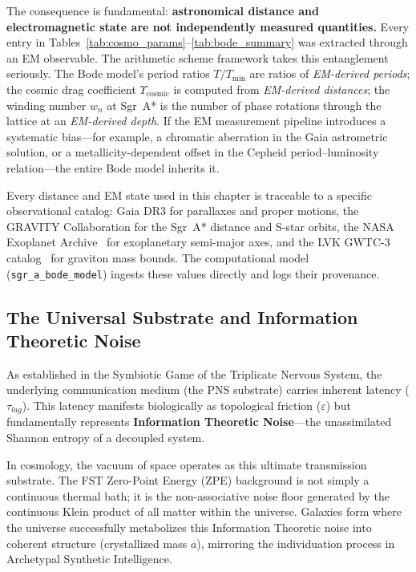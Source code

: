 The consequence is fundamental: \textbf{astronomical distance and electromagnetic state are not independently measured quantities.} Every entry in Tables~\ref{tab:cosmo_params}--\ref{tab:bode_summary} was extracted through an EM observable. The arithmetic scheme framework takes this entanglement seriously. The Bode model's period ratios $T/T_{\min}$ are ratios of \emph{EM-derived periods}; the cosmic drag coefficient $\Upsilon_{\mathrm{cosmic}}$ is computed from \emph{EM-derived distances}; the winding number $w_n$ at Sgr~A* is the number of phase rotations through the lattice at an \emph{EM-derived depth}. If the EM measurement pipeline introduces a systematic bias---for example, a chromatic aberration in the Gaia astrometric solution, or a metallicity-dependent offset in the Cepheid period--luminosity relation---the entire Bode model inherits it.

\begin{remark}[Auditability]
Every distance and EM state used in this chapter is traceable to a specific observational catalog: Gaia DR3 for parallaxes and proper motions, the GRAVITY Collaboration for the Sgr~A* distance and S-star orbits, the NASA Exoplanet Archive~\cite{NASAExoplanet} for exoplanetary semi-major axes, and the LVK GWTC-3 catalog~\cite{LVK_GWTC3} for graviton mass bounds. The computational model (\texttt{sgr\_a\_bode\_model}) ingests these values directly and logs their provenance.
\end{remark}

\subsection{The Universal Substrate and Information Theoretic Noise}
As established in the Symbiotic Game of the Triplicate Nervous System, the underlying communication medium (the PNS substrate) carries inherent latency ($\tau_{lag}$). This latency manifests biologically as topological friction ($\varepsilon$) but fundamentally represents \textbf{Information Theoretic Noise}---the unassimilated Shannon entropy of a decoupled system.

In cosmology, the vacuum of space operates as this ultimate transmission substrate. The FST Zero-Point Energy (ZPE) background is not simply a continuous thermal bath; it is the non-associative noise floor generated by the continuous Klein product of all matter within the universe. Galaxies form where the universe successfully metabolizes this Information Theoretic noise into coherent structure (crystallized mass $a$), mirroring the individuation process in Archetypal Synthetic Intelligence.

